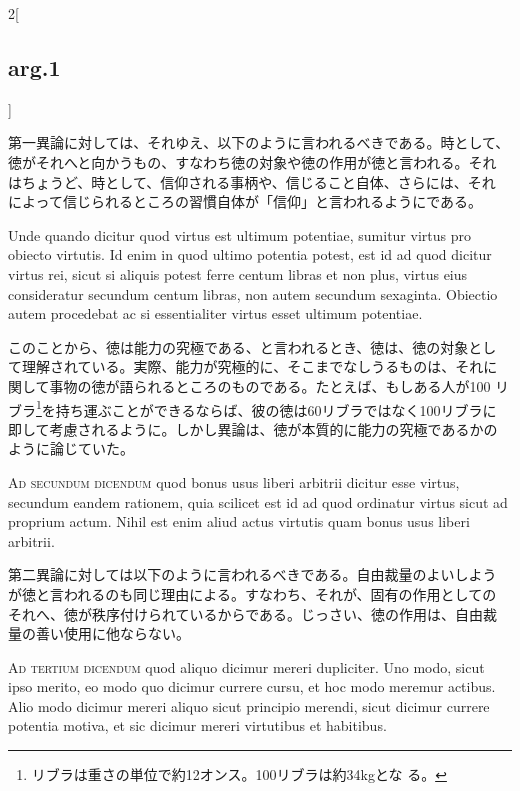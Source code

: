 \documentclass[paper=a4paper,fontsize=10pt,jafontsize=9pt,titlepage]{jlreq}
\begin{document}
\begin{paracol}{2}[\subsection{arg.1}]
\switchcolumn

第一異論に対しては、それゆえ、以下のように言われるべきである。時として、
徳がそれへと向かうもの、すなわち徳の対象や徳の作用が徳と言われる。それ
はちょうど、時として、信仰される事柄や、信じること自体、さらには、それ
によって信じられるところの習慣自体が「信仰」と言われるようにである。

\switchcolumn*

Unde quando dicitur quod virtus est ultimum potentiae, sumitur virtus
pro obiecto virtutis. Id enim in quod ultimo potentia potest, est id
ad quod dicitur virtus rei, sicut si aliquis potest ferre centum
libras et non plus, virtus eius consideratur secundum centum libras,
non autem secundum sexaginta. Obiectio autem procedebat ac si
essentialiter virtus esset ultimum potentiae.

\switchcolumn

このことから、徳は能力の究極である、と言われるとき、徳は、徳の対象とし
て理解されている。実際、能力が究極的に、そこまでなしうるものは、それに
関して事物の徳が語られるところのものである。たとえば、もしある人が100
リブラ\footnote{リブラは重さの単位で約12オンス。100リブラは約34kgとな
る。}を持ち運ぶことができるならば、彼の徳は60リブラではなく100リブラに
即して考慮されるように。しかし異論は、徳が本質的に能力の究極であるかの
ように論じていた。

\switchcolumn*[\subsection{ad.2}]

{\scshape Ad secundum dicendum} quod bonus usus liberi arbitrii
dicitur esse virtus, secundum eandem rationem, quia scilicet est id ad
quod ordinatur virtus sicut ad proprium actum. Nihil est enim aliud
actus virtutis quam bonus usus liberi arbitrii.

\switchcolumn

第二異論に対しては以下のように言われるべきである。自由裁量のよいしよう
が徳と言われるのも同じ理由による。すなわち、それが、固有の作用としての
それへ、徳が秩序付けられているからである。じっさい、徳の作用は、自由裁
量の善い使用に他ならない。

\switchcolumn*[\subsection{ad.3}]

{\scshape Ad tertium dicendum} quod aliquo dicimur mereri
dupliciter. Uno modo, sicut ipso merito, eo modo quo dicimur currere
cursu, et hoc modo meremur actibus. Alio modo dicimur mereri aliquo
sicut principio merendi, sicut dicimur currere potentia motiva, et sic
dicimur mereri virtutibus et habitibus.


\end{paracol}
\end{document}
